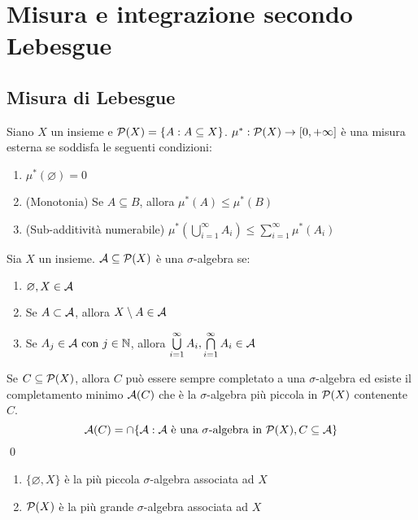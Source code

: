\chapter{Misura e integrazione secondo Lebesgue}

\section{Misura di Lebesgue}

\begin{definition}
	Siano $X$ un insieme e $\mathcal{P}(X)=\{A:A\subseteq X\}$. $\mu^*:\mathcal{P}(X)\to [0,+\infty]$ è una misura esterna se soddisfa le seguenti condizioni:
	\begin{enumerate}
		\item $\mu^*(\varnothing)=0$
		\item (Monotonia) Se $A\subseteq B$, allora $\mu^*(A) \leq \mu^*(B)$
		\item (Sub-additività numerabile) $\mu^*\left(\bigcup\limits_{i=1}^\infty A_i\right)\leq \sum\limits_{i=1}^\infty \mu^*(A_i)$
	\end{enumerate}
\end{definition}

\begin{definition}
	Sia $X$ un insieme. $\mathcal{A} \subseteq \mathcal{P}(X)$ è una $\sigma$-algebra se:
	\begin{enumerate}
		\item $\varnothing, X \in \mathcal{A}$
		\item Se $A\subset \mathcal{A}$, allora $X \setminus A \in \mathcal{A}$
		\item Se $A_j \in \mathcal{A} \text{ con } j \in \mathbb{N}$, allora $\bigcup\limits_{i=1}^\infty A_i, \bigcap\limits_{i=1}^\infty A_i \in \mathcal{A}$
	\end{enumerate}
\end{definition}

\begin{prop}
	Se $C \subseteq \mathcal{P}(X)$, allora $C$ può essere sempre completato a una $\sigma$-algebra ed esiste il completamento minimo $\mathcal{A}(C)$ che è la $\sigma$-algebra più piccola in $\mathcal{P}(X)$ contenente $C$.
	$$
		\mathcal{A}(C)=\cap\{\mathcal{A}:\mathcal{A} \text{ è una } \sigma \text{-algebra in } \mathcal{P}(X), C \subseteq \mathcal{A}\}
	$$
	\qed
\end{prop}

\begin{remark}\leavevmode
	\begin{enumerate}
		\item $\{\varnothing,X\}$ è la più piccola $\sigma$-algebra associata ad $X$
		\item $\mathcal{P}(X)$ è la più grande $\sigma$-algebra associata ad $X$
	\end{enumerate}
\end{remark}

